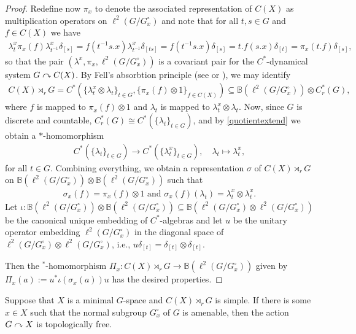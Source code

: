 \begin{proof}
	Redefine now $\pi_x$ to denote the associated representation of $C(X)$ as multiplication operators on $\ell^2(G/G_x^\circ)$ and note that for all $t,s \in G$ and $f \in C(X)$ we have
	\begin{align*}
		\lambda^x_t \pi_x (f) \lambda^x_{t^{-1}} \delta_{[s]} = f(t^{-1}s.x)\lambda^x_{t^{-1}} \delta_{[ts]} = f(t^{-1}s.x) \delta_{[s]} = t.f(s.x) \delta_{[t]} = \pi_x(t.f) \delta_{[s]},
	\end{align*}
	so that the pair $(\lambda^x, \pi_x, \ell^2(G/G_x^\circ))$ is a covariant pair for the $C^*$-dynamical system $G \stackrel{}{\curvearrowright} C(X)$. By Fell's absorbtion principle (see \cite[Proposition 4.1.7]{brown2008c} or \cite[25]{approxtalk}), we may identify
	\begin{align*}
		C(X) \rtimes_r G =C^*\left(\{\lambda^x_t \otimes  \lambda_t \}_{t \in G} , \{\pi_x(f) \otimes 1 \}_{f \in C(X)}\right) \subseteq \mathbb{B}(\ell^2(G/G_x^\circ)) \otimes C_r^*(G),
	\end{align*}
	where $f$ is mapped to $\pi_x(f) \otimes 1$ and $\lambda_t$ is mapped to $\lambda^x_t \otimes \lambda_t$. Now, since $G$ is discrete and countable, $C_r^*(G) \cong C^*(\{\lambda_t\}_{t \in G})$, and by \cref{quotientextend} we obtain a $*$-homomorphism 
\begin{align*}
	 C^*(\{\lambda_t\}_{t \in G}) \to C^*(\{\lambda_t^x\}_{t \in G}), \quad \lambda_t\mapsto  \lambda_t^x,
\end{align*}
for all $t \in G$. Combining everything, we obtain a representation $\sigma$ of $C(X) \rtimes_r G$ on $\mathbb{B}(\ell^2(G/G_x^\circ)) \otimes \mathbb{B}(\ell^2(G/G_x^\circ))$ such that
\begin{align*}
	\sigma_x(f) = \pi_x(f) \otimes 1 \text{  and  } \sigma_x(f)(\lambda_t)=\lambda_t^x \otimes \lambda_t^x.	
\end{align*}
Let $\iota \colon \mathbb{B}(\ell^2(G/G_x^\circ)) \otimes \mathbb{B}(\ell^2(G/G_x^\circ)) \subseteq  \mathbb{B}(\ell^2(G/G_x^\circ) \otimes \ell^2(G/G_x^\circ))$ be the canonical unique embedding of $C^*$-algebras and let $u$ be the unitary operator embedding $\ell^2(G/G_x^\circ)$ in the diagonal space of $\ell^2(G/G_x^\circ) \otimes \ell^2(G/G_x^\circ)$, i.e., $u \delta_{[t]} = \delta_{[t]} \otimes \delta_{[t]}$.

Then the $^*$-homomorphism $\Pi_x \colon C(X) \rtimes_r G \to \mathbb{B}(\ell^2(G/G_x^\circ))$ given by $\Pi_x(a) := u^* \iota(\sigma_x(a)) u $ has the desired properties.
\end{proof}
\begin{proposition}
	Suppose that $X$ is a minimal $G$-space and $C(X) \rtimes_r G$ is simple. If there is some $x \in X$ such that the normal subgroup $G_x^\circ$ of $G$ is amenable, then the action $G \stackrel{ }{\curvearrowright} X$ is topologically free. 
	\label{ozawa15pt2}
\end{proposition}
